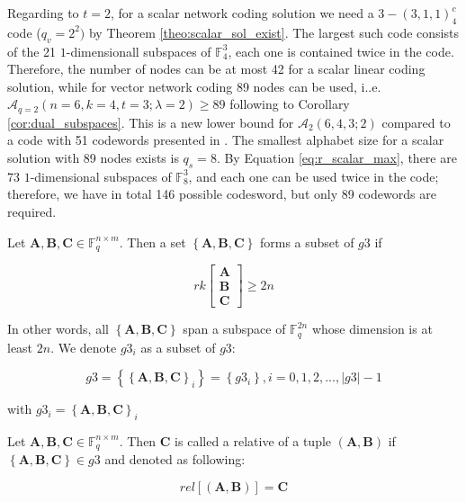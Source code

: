 Regarding to $t=2$, for a scalar network coding solution we need
a $3-\left(3,1,1\right)_{4}^{c}$ code ($q_{v}=2^{2})$ by Theorem
\ref{theo:scalar_sol_exist}. The largest such code consists of the
21 $1$-dimensionall subspaces of $\ensuremath{\mathbb{F}}_{4}^{3}$,
each one is contained twice in the code. Therefore, the number of
nodes can be at most 42 for a scalar linear coding solution, while
for vector network coding 89 nodes can be used, i..e. $\mathcal{A}_{q=2}\left(n=6,k=4,t=3;\lambda=2\right)\geq89$
following to Corollary \ref{cor:dual_subspaces}. This is a new lower
bound for $\mathcal{A}_{2}\left(6,4,3;2\right)$ compared to a code
with 51 codewords presented in \cite{Wachter-Zeh:2018}. The smallest
alphabet size for a scalar solution with 89 nodes exists is $q_{s}=8$.
By Equation \ref{eq:r_scalar_max}, there are 73 $1$-dimensional
subspaces of $\ensuremath{\mathbb{F}}_{8}^{3}$, and each one can
be used twice in the code; therefore, we have in total 146 possible
codesword, but only 89 codewords are required.
\begin{defn}[G3]
 Let $\boldsymbol{A},\boldsymbol{B},\boldsymbol{C}\in\ensuremath{\mathbb{F}}_{q}^{n\times m}$.
Then a set $\left\{ \boldsymbol{A},\boldsymbol{B},\boldsymbol{C}\right\} $
forms a subset of $g3$ if

\[
rk\left[\begin{array}{c}
\boldsymbol{A}\\
\boldsymbol{B}\\
\boldsymbol{C}
\end{array}\right]\geq2n
\]

In other words, all $\left\{ \boldsymbol{A},\boldsymbol{B},\boldsymbol{C}\right\} $
span a subspace of $\ensuremath{\mathbb{F}}_{q}^{2n}$ whose dimension
is at least $2n$. We denote $g3_{i}$ as a subset of $g3$:

\[
g3=\left\{ \left\{ \boldsymbol{A},\boldsymbol{B},\boldsymbol{C}\right\} _{i}\right\} =\left\{ g3_{i}\right\} ,i=0,1,2,...,\left|g3\right|-1
\]

with $g3_{i}=\left\{ \boldsymbol{A},\boldsymbol{B},\boldsymbol{C}\right\} _{i}$
\end{defn}
%
\begin{defn}[Relative]
 Let $\boldsymbol{A},\boldsymbol{B},\boldsymbol{C}\in\ensuremath{\mathbb{F}}_{q}^{n\times m}$.
Then $\boldsymbol{C}$ is called a relative of a tuple $\left(\boldsymbol{A},\boldsymbol{B}\right)$
if $\left\{ \boldsymbol{A},\boldsymbol{B},\boldsymbol{C}\right\} \in g3$
and denoted as following:

\[
rel\left[\left(\boldsymbol{A},\boldsymbol{B}\right)\right]=\boldsymbol{C}
\]
\end{defn}
